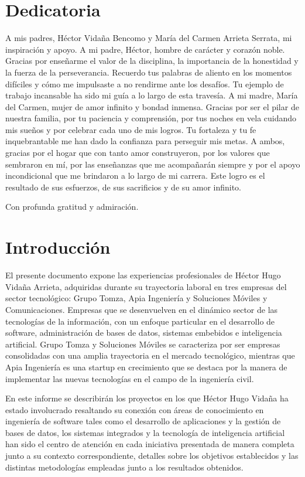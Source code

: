 \documentclass[final, fmstyle, 12pt]{article}
\begin{document}
\section*{Dedicatoria}
\setlength{\parskip}{1em}
A mis padres, Héctor Vidaña Bencomo y María del Carmen Arrieta Serrata, mi inspiración y apoyo.
A mi padre, Héctor, hombre de carácter y corazón noble. Gracias por enseñarme el valor de la disciplina, la importancia de la honestidad y la fuerza de la perseverancia. Recuerdo tus palabras de aliento en los momentos difíciles y cómo me impulsaste a no rendirme ante los desafíos. Tu ejemplo de trabajo incansable ha sido mi guía a lo largo de esta travesía.
A mi madre, María del Carmen, mujer de  amor infinito y  bondad inmensa. Gracias por ser el pilar de nuestra familia, por tu paciencia y comprensión, por tus noches en vela cuidando mis sueños y por celebrar cada uno de mis logros.  Tu fortaleza y tu fe inquebrantable me han dado la confianza para perseguir mis metas.
A ambos, gracias por el hogar que con tanto amor construyeron, por los valores que sembraron en mí, por las enseñanzas que me acompañarán siempre y por el apoyo incondicional que me brindaron a lo largo de mi carrera. Este logro es el resultado de sus esfuerzos, de sus sacrificios y de su amor infinito.


Con profunda gratitud y admiración.
\newpage
\tableofcontents
\listoffigures

\newpage
\section{Introducción}
\setlength{\parskip}{1em} 
El presente documento expone las experiencias profesionales de Héctor Hugo Vidaña Arrieta, 
adquiridas durante su trayectoria laboral en tres empresas del sector tecnológico: 
Grupo Tomza, Apia Ingeniería y Soluciones Móviles y Comunicaciones. 
Empresas que se desenvuelven en el dinámico sector de las tecnologías de la información, 
con un enfoque particular en el desarrollo de software, administración de bases de datos,
sistemas embebidos e inteligencia artificial. Grupo Tomza y Soluciones Móviles se caracteriza por ser empresas consolidadas con una amplia trayectoria en el mercado tecnológico, mientras que Apia Ingeniería es una startup en crecimiento que se destaca por la manera de implementar las nuevas tecnologías en el campo de la ingeniería civil.

En este informe se describirán los proyectos en los que Héctor Hugo Vidaña ha estado involucrado resaltando su conexión con áreas de conocimiento en ingeniería de software tales como el desarrollo de aplicaciones y la gestión de bases de datos,
los sistemas integrados y la tecnología de inteligencia artificial han sido el centro de atención en cada iniciativa presentada de manera completa junto a su contexto correspondiente, detalles sobre los objetivos establecidos y las distintas metodologías empleadas junto a los resultados obtenidos.
\end{document}
